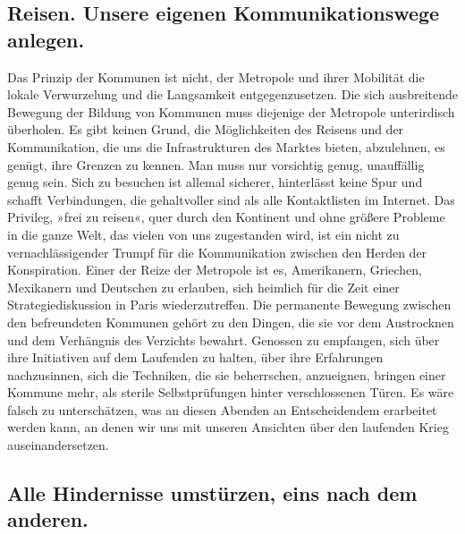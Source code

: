 \subsection{Reisen. Unsere eigenen Kommunikationswege anlegen.}

Das Prinzip der Kommunen ist nicht, der Metropole und ihrer
Mobilität die lokale Verwurzelung und die Langsamkeit
entgegenzusetzen. Die sich ausbreitende Bewegung der Bildung von
Kommunen muss diejenige der Metropole unterirdisch überholen. Es
gibt keinen Grund, die Möglichkeiten des Reisens und der
Kommunikation, die uns die Infrastrukturen des Marktes bieten,
abzulehnen, es genügt, ihre Grenzen zu kennen. Man muss nur
vorsichtig genug, unauffällig genug sein. Sich zu besuchen ist
allemal sicherer, hinterlässt keine Spur und schafft Verbindungen,
die gehaltvoller sind als alle Kontaktlisten im Internet. Das
Privileg, »frei zu reisen«, quer durch den Kontinent und ohne
größere Probleme in die ganze Welt, das vielen von uns zugestanden
wird, ist ein nicht zu vernachlässigender Trumpf für die
Kommunikation zwischen den Herden der Konspiration. Einer der Reize
der Metropole ist es, Amerikanern, Griechen, Mexikanern und
Deutschen zu erlauben, sich heimlich für die Zeit einer
Strategiediskussion in Paris wiederzutreffen.
Die permanente Bewegung zwischen den befreundeten Kommunen gehört
zu den Dingen, die sie vor dem Austrocknen und dem Verhängnis des
Verzichts bewahrt. Genossen zu empfangen, sich über ihre
Initiativen auf dem Laufenden zu halten, über ihre Erfahrungen
nachzusinnen, sich die Techniken, die sie beherrschen, anzueignen,
bringen einer Kommune mehr, als sterile Selbstprüfungen hinter
verschlossenen Türen. Es wäre falsch zu unterschätzen, was an
diesen Abenden an Entscheidendem erarbeitet werden kann, an denen
wir uns mit unseren Ansichten über den laufenden Krieg
auseinandersetzen.

\subsection{Alle Hindernisse umstürzen, eins nach dem anderen.}

